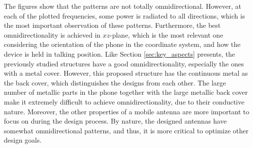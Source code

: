 The figures show that the patterns are not totally omnidirectional. However, at each of the plotted frequencies, some power is radiated to all directions, which is the most important observation of these patterns. Furthermore, the best omnidirectionality is achieved in $xz$-plane, which is the most relevant one considering the orientation of the phone in the coordinate system, and how the device is held in talking position. Like Section \ref{sec:key_aspects} presents, the previously studied structures have a good omnidirectionality, especially the ones with a metal cover. However, this proposed structure has the continuous metal as the back cover, which distinguishes the designs from each other. The large number of metallic parts in the phone together with the large metallic back cover make it extremely difficult to achieve omnidirectionality, due to their conductive nature. Moreover, the other properties of a mobile antenna are more important to focus on during the design process. By nature, the designed antennas have somewhat omnidirectional patterns, and thus, it is more critical to optimize other design goals.
\clearpage